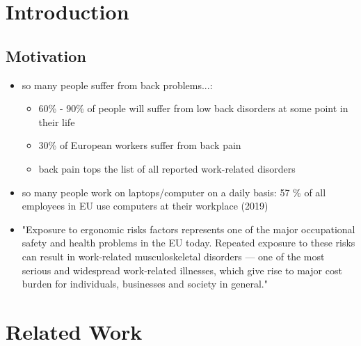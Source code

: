 \section{Introduction} %
\label{introduction}
\subsection{Motivation}
\begin{itemize}
    \item so many people suffer from back problems...: 
    \begin{itemize}
        \item 60\% - 90\% of people will suffer from low back disorders at some point in their life \cite{osha2000facts}
        \item 30\% of European workers suffer from back pain \cite{osha2000facts}
        \item back pain tops the list of all reported work-related disorders \cite{osha2000facts}
    \end{itemize}
    \item so many people work on laptops/computer on a daily basis: 57 \% of all employees in EU use computers at their workplace (2019) \cite{eurostat_comp_use}
    \item "Exposure to ergonomic risks factors represents one of the major occupational safety and health problems in the EU today. Repeated exposure to these risks can result in work-related musculoskeletal disorders — one of the most serious and widespread work-related illnesses, which give rise to major cost burden for individuals, businesses and society in general." \cite{osha2019msd}
\end{itemize}



\section{Related Work} %
\label{related-work}

